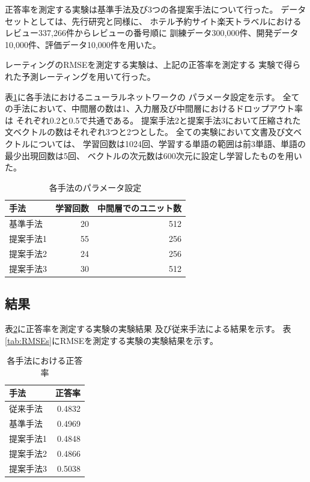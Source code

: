 \documentclass[twocolumn,a4paper]{ltjarticle}
\begin{document}
正答率を測定する実験は基準手法及び3つの各提案手法について行った。
データセットとしては、先行研究\cite{fujitani15}と同様に、
ホテル予約サイト楽天トラベルにおけるレビュー337,266件からレビューの番号順に
訓練データ300,000件、開発データ10,000件、評価データ10,000件を用いた。

レーティングのRMSEを測定する実験は、上記の正答率を測定する
実験で得られた予測レーティングを用いて行った。

表\ref{tab:ParametersOfMethods}に各手法におけるニューラルネットワークの
パラメータ設定を示す。
全ての手法において、中間層の数は1、入力層及び中間層におけるドロップアウト率は
それぞれ0.2と0.5で共通である。
提案手法2と提案手法3において圧縮された文ベクトルの数はそれぞれ3つと2つとした。
全ての実験において文書及び文ベクトルについては、
学習回数は1024回、学習する単語の範囲は前3単語、単語の最少出現回数は5回、
ベクトルの次元数は600次元に設定し学習したものを用いた。

\begin{table}
  \caption{各手法のパラメータ設定}
  \centering
  \begin{tabular}{l | r r} \label{tab:ParametersOfMethods}
    手法 & 学習回数 & 中間層でのユニット数 \\
    \hline
    基準手法  & 20 & 512 \\
    提案手法1 & 55 & 256 \\
    提案手法2 & 24 & 256 \\
    提案手法3 & 30 & 512 \\
  \end{tabular}
\end{table}


\subsection{結果}

表\ref{tab:Accuracies}に正答率を測定する実験の実験結果
及び従来手法\cite{fujitani15}による結果を示す。
表\ref{tab:RMSEs}にRMSEを測定する実験の実験結果を示す。

\begin{table}
  \caption{各手法における正答率}
  \centering
  \begin{tabular}{l | r} \label{tab:Accuracies}
    手法 & 正答率 \\
    \hline
    従来手法\cite{fujitani15}  & 0.4832 \\
    基準手法  & 0.4969 \\
    提案手法1 & 0.4848 \\
    提案手法2 & 0.4866 \\
    提案手法3 & 0.5038 \\
  \end{tabular}
\end{table}
\end{document}
